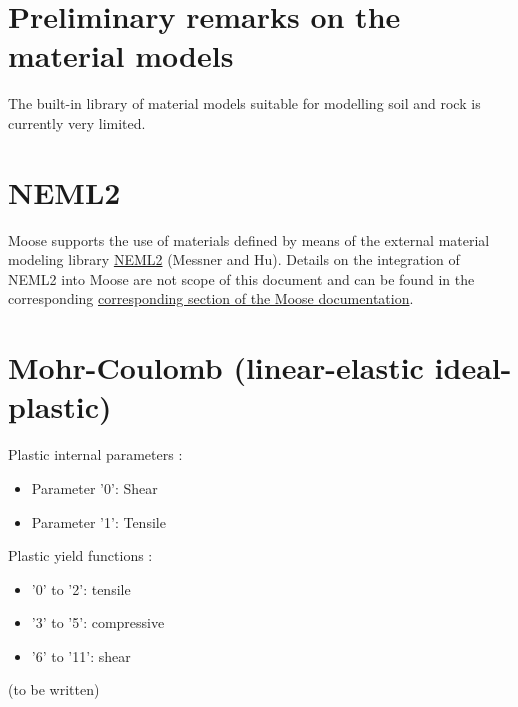 \section{Preliminary remarks on the material models}
\label{chap:material-remarks}

The built-in library of material models suitable for modelling soil and rock is
currently very limited.

\section{NEML2}
\label{chap:material-NEML2}

Moose supports the use of materials defined by means of the external material
modeling library \href{https://github.com/reverendbedford/neml2}{NEML2}
(Messner and Hu). Details on the integration of NEML2 into Moose are not scope
of this document and can be found in the corresponding
\href{https://mooseframework.inl.gov/moose/modules/solid_mechanics/NEML2.html}{corresponding
      section of the Moose documentation}.

\section{\todomarker Mohr-Coulomb (linear-elastic ideal-plastic)}
\label{chap:material-mohr-coulomb}


Plastic internal parameters  :
\begin{itemize}
      \item Parameter '0': Shear
      \item Parameter '1': Tensile
\end{itemize}

Plastic yield functions :
\begin{itemize}
      \item '0' to '2': tensile
      \item '3' to '5': compressive
      \item '6' to '11': shear
\end{itemize}

(to be written)

